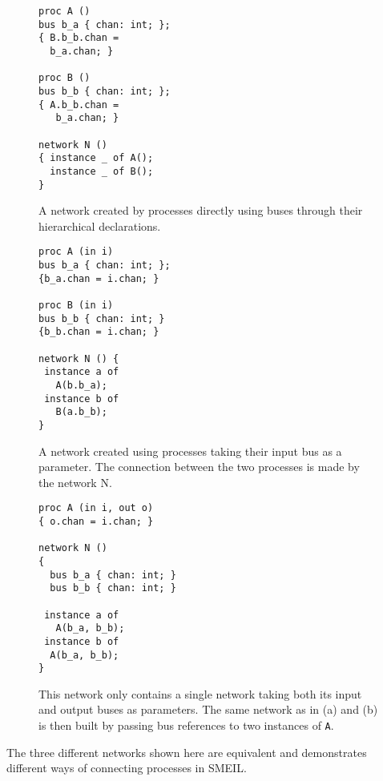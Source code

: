 \begin{widefigure}
  \begin{subfigure}[t]{0.33\textwidth}
    \begin{lstlisting}[language=smeil]
proc A ()
bus b_a { chan: int; };
{ B.b_b.chan =
  b_a.chan; }

proc B ()
bus b_b { chan: int; };
{ A.b_b.chan =
   b_a.chan; }

network N ()
{ instance _ of A();
  instance _ of B();
}
\end{lstlisting}
  \caption{A network created by processes directly using buses through their
    hierarchical declarations.}
  \end{subfigure}
  \begin{subfigure}[t]{0.33\textwidth}
    \begin{lstlisting}[language=smeil]
proc A (in i)
bus b_a { chan: int; };
{b_a.chan = i.chan; }

proc B (in i)
bus b_b { chan: int; }
{b_b.chan = i.chan; }

network N () {
 instance a of
   A(b.b_a);
 instance b of
   B(a.b_b);
}
\end{lstlisting}
    \caption{A network created using processes taking their input bus as a
      parameter. The connection between the two processes is made by the network
      N.}
  \end{subfigure}
  \begin{subfigure}[t]{0.32\textwidth}
    \begin{lstlisting}[language=smeil]
proc A (in i, out o)
{ o.chan = i.chan; }

network N ()
{
  bus b_a { chan: int; }
  bus b_b { chan: int; }

 instance a of
   A(b_a, b_b);
 instance b of
  A(b_a, b_b);
}
\end{lstlisting}
    \caption{This network only contains a single network taking both its input
      and output buses as parameters. The same network as in (a) and (b) is then
      built by passing bus references to two instances of {\tt A}.}
    
  \end{subfigure}

  \caption{The three different networks shown here are equivalent and
    demonstrates different ways of connecting processes in SMEIL.}
  \label{fig:comms}
\end{widefigure}

